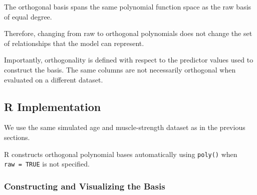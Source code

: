 \documentclass[
  letterpaper,
  DIV=11,
  numbers=noendperiod]{scrreprt}
\begin{document}
The orthogonal basis spans the same polynomial function space as the raw
basis of equal degree.

Therefore, changing from raw to orthogonal polynomials does not change
the set of relationships that the model can represent.

Importantly, orthogonality is defined with respect to the predictor
values used to construct the basis. The same columns are not necessarily
orthogonal when evaluated on a different dataset.

\subsection{R Implementation}\label{r-implementation-2}

We use the same simulated age and muscle-strength dataset as in the
previous sections.

R constructs orthogonal polynomial bases automatically using
\texttt{poly()} when \texttt{raw\ =\ TRUE} is not specified.

\subsubsection{Constructing and Visualizing the
Basis}\label{constructing-and-visualizing-the-basis}
\end{document}
